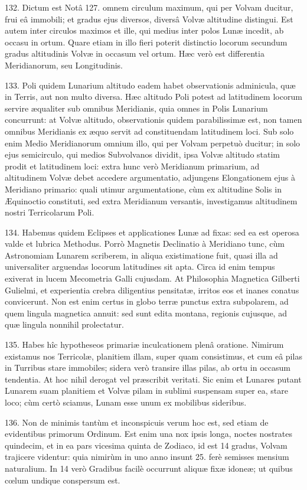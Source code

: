\documentclass[a4paper, 11pt, oneside, polutonikogreek, german]{article}
\begin{document}
132. Dictum est Notâ 127. omnem circulum maximum, qui per Volvam ducitur, frui eâ immobili; et gradus ejus diversos, diversâ Volvæ altitudine distingui. Est autem inter circulos maximos et ille, qui medius inter polos Lunæ incedit, ab occasu in ortum. Quare etiam in illo fieri poterit distinctio locorum secundum gradus altitudinis Volvæ in occasum vel ortum. Hæc verò est differentia Meridianorum, seu Longitudinis.

133. Poli quidem Lunarium altitudo eadem habet observationis adminicula, quæ in Terris, aut non multo diversa. Hæc altitudo Poli potest ad latitudinem locorum servire æqualiter sub omnibus Meridianis, quia omnes in Polis Lunarium concurrunt: at Volvæ altitudo, observationis quidem parabilissimæ est, non tamen omnibus Meridianis ex æquo servit ad constituendam latitudinem loci. Sub solo enim Medio Meridianorum omnium illo, qui per Volvam perpetuò ducitur; in solo ejus semicirculo, qui medios Subvolvanos dividit, ipsa Volvæ altitudo statim prodit et latitudinem loci: extra hunc verò Meridianum primarium, ad altitudinem Volvæ debet accedere argumentatio, adjungens Elongationem ejus à Meridiano primario: quali utimur argumentatione, cùm ex altitudine Solis in Æquinoctio constituti, sed extra Meridianum versantis, investigamus altitudinem nostri Terricolarum Poli.

134. Habemus quidem Eclipses et applicationes Lunæ ad fixas: sed ea est operosa valde et lubrica Methodus. Porrò Magnetis Declinatio à Meridiano tunc, cùm Astronomiam Lunarem scriberem, in aliqua existimatione fuit, quasi illa ad universaliter arguendas locorum latitudines sit apta. Circa id enim tempus exiverat in lucem Mecometria Galli cujusdam. At Philosophia Magnetica Gilberti Gulielmi, et experientia crebra diligentius pensitatæ, irritos eos et inanes conatus convicerunt. Non est enim certus in globo terræ punctus extra subpolarem, ad quem lingula magnetica annuit: sed sunt edita montana, regionis cujusque, ad quæ lingula nonnihil prolectatur.

135. Habes hîc hypotheseos primariæ inculcationem plenâ oratione. Nimirum existamus nos Terricolæ, planitiem illam, super quam consistimus, et cum eâ pilas in Turribus stare immobiles; sidera verò transire illas pilas, ab ortu in occasum tendentia. At hoc nihil derogat vel præscribit veritati. Sic enim et Lunares putant Lunarem suam planitiem et Volvæ pilam in sublimi suspensam super ea, stare loco; cùm certò sciamus, Lunam esse unum ex mobilibus sideribus.

136. Non de minimis tantùm et inconspicuis verum hoc est, sed etiam de evidentibus primorum Ordinum. Est enim una nox ipsis longa, noctes nostrates quindecim, et in ea pars vicesima quinta de Zodiaco, id est 14 gradus, Volvam trajicere videntur: quia nimirùm in uno anno insunt 25. ferè semisses mensium naturalium. In 14 verò Gradibus facilè occurrunt aliquæ fixæ idoneæ; ut quibus cœlum undique conspersum est.
\end{document}
